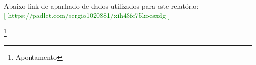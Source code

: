 \\
Abaixo link de apanhado de dados utilizados para este relatório:\\ \textcolor{green}{\small [ https://padlet.com/sergio1020881/xih48fe75koesxdg ]}

\newpage
%
%
\listoffigures
\cite{*}

\newpage
\footnote{Apontamento}

